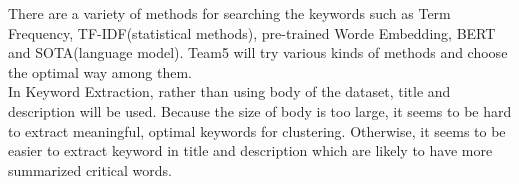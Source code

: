 There are a variety of methods for searching the keywords such as Term Frequency, TF-IDF(statistical methods), pre-trained Worde Embedding, BERT and SOTA(language model). Team5 will try various kinds of methods and choose the optimal way among them.\\
In Keyword Extraction, rather than using body of the dataset, title and description will be used. Because the size of body is too large, it seems to be hard to extract meaningful, optimal keywords for clustering. Otherwise, it seems to be easier to extract keyword in title and description which are likely to have more summarized critical words.